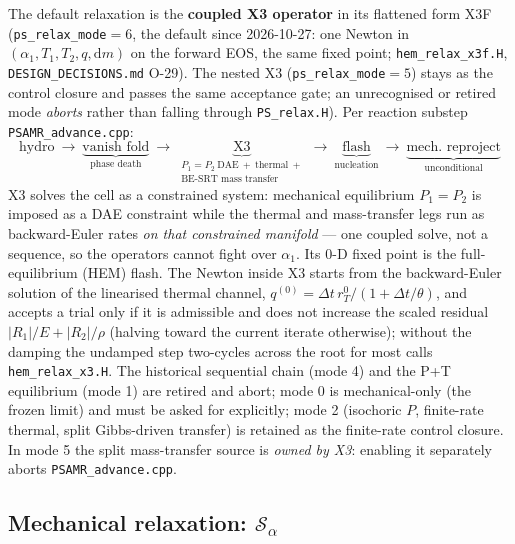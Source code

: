 \documentclass[11pt,a4paper]{article}
\newcommand{\code}[1]{\texttt{\small #1}}
\newcommand{\src}[1]{{\color{gray}\code{#1}}}
\begin{document}
The default relaxation is the \textbf{coupled X3 operator} in its
flattened form X3F (\code{ps\_relax\_mode}$=6$, the default since
2026-10-27: one Newton in $(\alpha_1, T_1, T_2, q, \mathrm{d}m)$ on the
forward EOS, the same fixed point; \src{hem\_relax\_x3f.H},
\code{DESIGN\_DECISIONS.md} O-29).  The nested X3
(\code{ps\_relax\_mode}$=5$) stays as the control closure and passes the
same acceptance gate; an unrecognised or retired mode \emph{aborts} rather
than falling through \src{PS\_relax.H}).  Per reaction substep
\src{PSAMR\_advance.cpp}:
\begin{equation}
  \text{hydro}\ \longrightarrow\
  \underbrace{\text{vanish fold}}_{\text{phase death}}\ \longrightarrow\
  \underbrace{\text{X3}}_{\substack{P_1=P_2\ \text{DAE}\ +\ \text{thermal}\ +\\
                                    \text{BE-SRT mass transfer}}}\ \longrightarrow\
  \underbrace{\text{flash}}_{\text{nucleation}}\ \longrightarrow\
  \underbrace{\text{mech.\ reproject}}_{\text{unconditional}}
  \label{eq:chain}
\end{equation}
X3 solves the cell as a constrained system: mechanical equilibrium
$P_1\!=\!P_2$ is imposed as a DAE constraint while the thermal and
mass-transfer legs run as backward-Euler rates \emph{on that constrained
manifold} --- one coupled solve, not a sequence, so the operators cannot
fight over $\alpha_1$.  Its 0-D fixed point is the full-equilibrium (HEM)
flash.  The Newton inside X3 starts from the backward-Euler solution of the
linearised thermal channel, $q^{(0)}=\Delta t\,r_T^0/(1+\Delta t/\theta)$,
and accepts a trial only if it is admissible and does not increase the
scaled residual $|R_1|/E+|R_2|/\rho$ (halving toward the current iterate
otherwise); without the damping the undamped step two-cycles across the
root for most calls \src{hem\_relax\_x3.H}.  The historical sequential
chain (mode 4) and the P+T equilibrium (mode 1) are retired and abort;
mode 0 is mechanical-only (the frozen limit) and must be asked for
explicitly; mode 2 (isochoric $P$, finite-rate thermal, split Gibbs-driven
transfer) is retained as the finite-rate control closure.  In mode 5 the
split mass-transfer source is \emph{owned by X3}: enabling it separately
aborts \src{PSAMR\_advance.cpp}.

\subsection{Mechanical relaxation: $\mathcal{S}_\alpha$}
\end{document}
